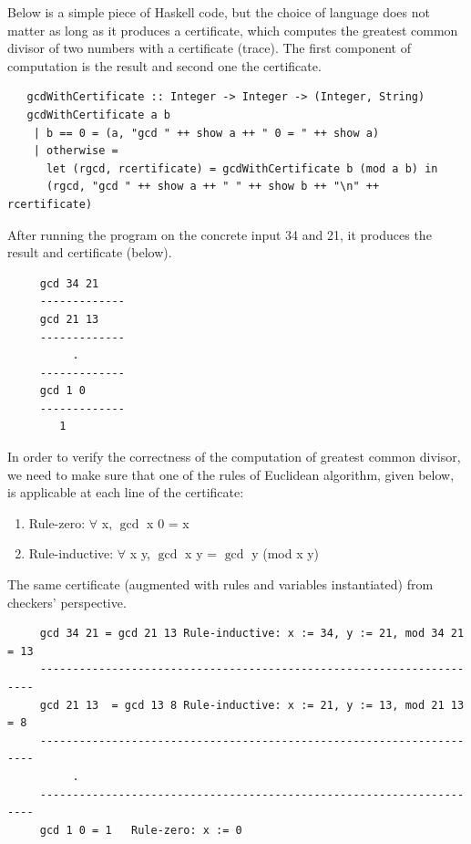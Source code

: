   \noindent
   Below is a simple piece of Haskell code, but the choice of language does not matter as long as it 
   produces a certificate, which computes the greatest common divisor 
   of two numbers with a certificate (trace).  The first component of computation is the result and second one 
   the certificate. 
   \begin{verbatim}
   gcdWithCertificate :: Integer -> Integer -> (Integer, String)
   gcdWithCertificate a b
    | b == 0 = (a, "gcd " ++ show a ++ " 0 = " ++ show a)
    | otherwise = 
      let (rgcd, rcertificate) = gcdWithCertificate b (mod a b) in
      (rgcd, "gcd " ++ show a ++ " " ++ show b ++ "\n" ++ rcertificate)
   \end{verbatim}
  
   \noindent 
   After running the program on the concrete input 34 and 21, it produces the result and certificate (below).
   \begin{verbatim}
     gcd 34 21
     -------------
     gcd 21 13
     -------------
          .
     -------------
     gcd 1 0 
     -------------
        1
   \end{verbatim}
   
   
   In order to verify the correctness of the computation of greatest common divisor, we need to 
    make sure that one of the rules of Euclidean algorithm, given below, is applicable at 
    each line of the certificate:
   \begin{enumerate}
   \item Rule-zero: $\forall$ x, $\gcd$ x 0 = x
   \item Rule-inductive: $\forall$ x y, $\gcd$ x y = $\gcd$ y (mod x y)
   \end{enumerate}

 \noindent	
  The same certificate (augmented with rules and variables instantiated) from checkers'  perspective.
    \begin{verbatim}
     gcd 34 21 = gcd 21 13 Rule-inductive: x := 34, y := 21, mod 34 21 = 13
     ---------------------------------------------------------------------
     gcd 21 13  = gcd 13 8 Rule-inductive: x := 21, y := 13, mod 21 13 = 8
     ---------------------------------------------------------------------
          .
     ---------------------------------------------------------------------
     gcd 1 0 = 1   Rule-zero: x := 0 
   \end{verbatim}
   
